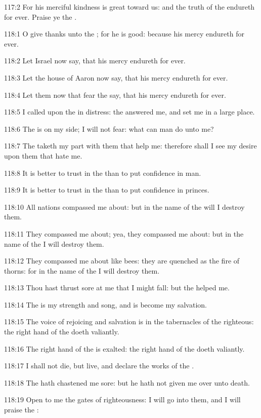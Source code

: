 117:2 For his merciful kindness is great toward us: and the truth of
the \LORD endureth for ever. Praise ye the \LORD.



118:1 O give thanks unto the \LORD; for he is good: because his mercy
endureth for ever.

118:2 Let Israel now say, that his mercy endureth for ever.

118:3 Let the house of Aaron now say, that his mercy endureth for
ever.

118:4 Let them now that fear the \LORD say, that his mercy endureth for
ever.

118:5 I called upon the \LORD in distress: the \LORD answered me, and
set me in a large place.

118:6 The \LORD is on my side; I will not fear: what can man do unto
me?

118:7 The \LORD taketh my part with them that help me: therefore shall
I see my desire upon them that hate me.

118:8 It is better to trust in the \LORD than to put confidence in man.

118:9 It is better to trust in the \LORD than to put confidence in
princes.

118:10 All nations compassed me about: but in the name of the \LORD
will I destroy them.

118:11 They compassed me about; yea, they compassed me about: but in
the name of the \LORD I will destroy them.

118:12 They compassed me about like bees: they are quenched as the
fire of thorns: for in the name of the \LORD I will destroy them.

118:13 Thou hast thrust sore at me that I might fall: but the \LORD
helped me.

118:14 The \LORD is my strength and song, and is become my salvation.

118:15 The voice of rejoicing and salvation is in the tabernacles of
the righteous: the right hand of the \LORD doeth valiantly.

118:16 The right hand of the \LORD is exalted: the right hand of the
\LORD doeth valiantly.

118:17 I shall not die, but live, and declare the works of the \LORD.

118:18 The \LORD hath chastened me sore: but he hath not given me over
unto death.

118:19 Open to me the gates of righteousness: I will go into them, and
I will praise the \LORD:


